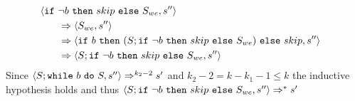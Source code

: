 \begin{exercise}
\begin{enumerate}
\begin{itemize}
\begin{itemize}
\begin{itemize}
\begin{itemize}
\begin{align*}
                                                \\
                                                &\left<\texttt{if}\ \neg b\ \texttt{then}\ skip\ \texttt{else}\ S_{we}, s''\right>
                                                \\&\qquad\Rightarrow \left<S_{we}, s''\right>
                                                \\&\qquad\Rightarrow \left<\texttt{if}\ b\ \texttt{then}\ (S; \texttt{if}\ \neg b\ \texttt{then}\ skip\ \texttt{else}\ S_{we})\ \texttt{else}\ skip, s''\right>
                                                \\&\qquad\Rightarrow \left<S; \texttt{if}\ \neg b\ \texttt{then}\ skip\ \texttt{else}\ S_{we}, s''\right>
                                            \end{align*}
                                            Since $\left<S; \texttt{while}\ b\ \texttt{do}\ S, s''\right> \Rightarrow^{k_2 - 2} s'$ and $k_2 - 2 = k - k_1 - 1 \leq k$ the inductive hypothesis holds and thus $\left<S; \texttt{if}\ \neg b\ \texttt{then}\ skip\ \texttt{else}\ S_{we}, s''\right> \Rightarrow^* s'$
                                    \end{itemize}
                            \end{itemize}
                    \end{itemize}
            \end{itemize}
    \end{enumerate}
\end{exercise}
